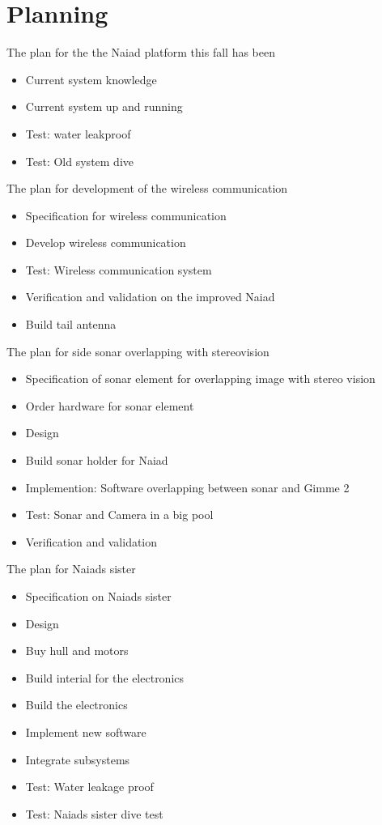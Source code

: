 \documentclass[cleardoublepage=plain]{scrartcl}
\begin{document}
\section{Planning}\label{sec:Planning} 
The plan for the the Naiad platform this fall has been
\begin{itemize}
\item Current system knowledge
\item Current system up and running
\item Test: water leakproof
\item Test: Old system dive
\end{itemize}

The plan for development of the wireless communication
\begin{itemize}
\item Specification for wireless communication
\item Develop wireless communication
\item Test: Wireless communication system
\item Verification and validation on the improved Naiad
\item  Build tail antenna
\end{itemize}

The plan for side sonar overlapping with stereovision
\begin{itemize}
\item Specification of sonar element for overlapping image with stereo vision
\item Order hardware for sonar element
\item Design
\item Build sonar holder for Naiad
\item Implemention: Software overlapping between sonar and Gimme 2
\item Test: Sonar and Camera in a big pool
\item Verification and validation
\end{itemize}

The plan for Naiads sister
\begin{itemize}
\item Specification on Naiads sister
\item Design
\item Buy hull and motors
\item Build interial for the electronics
\item Build the electronics
\item Implement new software
\item Integrate subsystems
\item Test: Water leakage proof
\item Test: Naiads sister dive test
\end{itemize}
\end{document}
